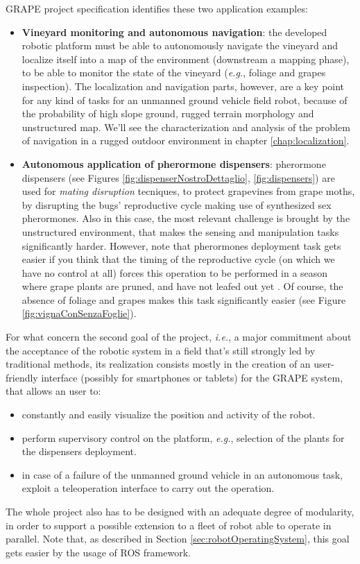 \ac{GRAPE} project specification identifies these two application examples:
\begin{itemize}
	\item \textbf{Vineyard monitoring and autonomous navigation}: the developed robotic platform must be able to autonomously navigate the vineyard and localize itself into a map of the environment (downstream a mapping phase), to be able to monitor the state of the vineyard (\textit{e.g.}, foliage and grapes inspection). The localization and navigation parts, however, are a key point for any kind of tasks for an unmanned ground vehicle field robot, because of the probability of high slope ground, rugged terrain morphology and unstructured map. We'll see the characterization and analysis of the problem of navigation in a rugged outdoor environment in chapter \ref{chap:localization}.
	\item \textbf{Autonomous application of pherormone dispensers}: pherormone dispensers (see Figures \ref{fig:dispenserNostroDettaglio}, \ref{fig:dispensers}) are used for \textit{mating disruption} tecniques, to protect grapevines from grape moths, by disrupting the bugs' reproductive cycle making use of synthesized sex pherormones. Also in this case, the most relevant challenge is brought by the unstructured environment, that makes the sensing and manipulation tasks significantly harder.  However, note that pherormones deployment task gets easier if you think that the timing of the reproductive cycle (on which we have no control at all) forces this operation to be performed in a season where grape plants are pruned, and have not leafed out yet \parencite{mateDisruptionEfficiency}. Of course, the absence of foliage and grapes makes this task significantly easier (see Figure \ref{fig:vignaConSenzaFoglie}).
\end{itemize}

For what concern the second goal of the project, \textit{i.e.}, a major commitment about the acceptance of the robotic system in a field that's still strongly led by traditional methods, its realization consists mostly in the creation of an user-friendly interface (possibly for smartphones or tablets) for the \ac{GRAPE} system, that allows an user to:
\begin{itemize}
	\item constantly and easily visualize the position and activity of the robot.
	\item perform supervisory control on the platform, \textit{e.g.}, selection of the plants for the dispensers deployment.
	\item in case of a failure of the unmanned ground vehicle in an autonomous task, exploit a teleoperation interface to carry out the operation.
\end{itemize}
The whole project also has to be designed with an adequate degree of modularity, in order to support a possible extension to a fleet of robot able to operate in parallel. Note that, as described in Section \ref{sec:robotOperatingSystem}, this goal gets easier by the usage of \ac{ROS} framework.


